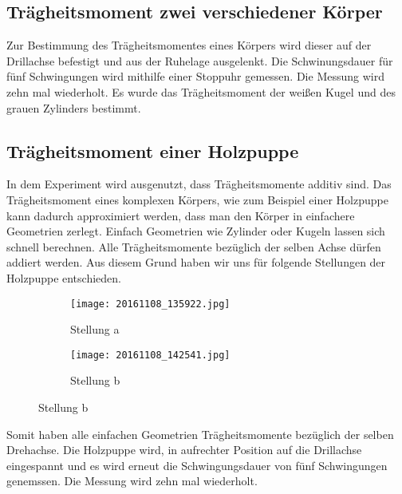 \subsection{Trägheitsmoment zwei verschiedener Körper}
Zur Bestimmung des Trägheitsmomentes eines Körpers wird dieser auf der Drillachse befestigt und aus der Ruhelage ausgelenkt. Die Schwinungsdauer für fünf Schwingungen wird mithilfe einer
Stoppuhr gemessen. Die Messung wird zehn mal wiederholt.
Es wurde das Trägheitsmoment der weißen Kugel und des grauen Zylinders bestimmt.
\subsection{Trägheitsmoment einer Holzpuppe}
In dem Experiment wird ausgenutzt, dass Trägheitsmomente additiv sind. Das Trägheitsmoment eines komplexen Körpers, wie zum Beispiel einer Holzpuppe kann dadurch approximiert werden, dass
man den Körper in einfachere Geometrien zerlegt. Einfach Geometrien wie Zylinder oder Kugeln lassen sich schnell berechnen. Alle Trägheitsmomente bezüglich der selben Achse dürfen addiert
werden.
Aus diesem Grund haben wir uns für folgende Stellungen der Holzpuppe entschieden.

\begin{figure}
  \centering
  \begin{subfigure}{0.48\textwidth}
    \centering
    \texttt{[image: 20161108\_135922.jpg]}
    \caption{Stellung a}
    \label{fig:stellunga}
  \end{subfigure}
  \begin{subfigure}{0.48\textwidth}
    \centering
    \texttt{[image: 20161108\_142541.jpg]}
    \caption{Stellung b}
    \label{fig:stellunb}
  \end{subfigure}
  \label{fig:Holzpuppe}
\end{figure}

Somit haben alle einfachen Geometrien Trägheitsmomente bezüglich der selben Drehachse. Die Holzpuppe wird, in aufrechter Position auf die Drillachse eingespannt und es wird erneut die Schwingungsdauer von fünf Schwingungen genemssen. Die Messung wird zehn mal wiederholt.
\newpage
%

